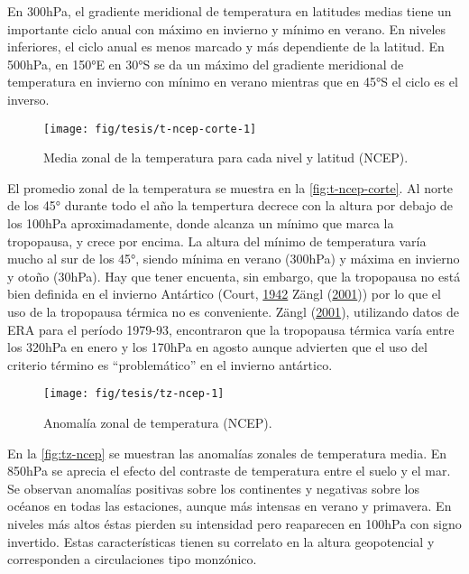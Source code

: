 \documentclass[spanish,a4paper,12pt]{book}
\begin{document}
En 300hPa, el gradiente meridional de temperatura en latitudes medias
tiene un importante ciclo anual con máximo en invierno y mínimo en
verano. En niveles inferiores, el ciclo anual es menos marcado y más
dependiente de la latitud. En 500hPa, en 150°E en 30°S se da un máximo
del gradiente meridional de temperatura en invierno con mínimo en verano
mientras que en 45°S el ciclo es el inverso.

\begin{figure*}
\texttt{[image: fig/tesis/t-ncep-corte-1]} \caption{Media zonal de la temperatura para cada nivel y latitud (NCEP).}\label{fig:t-ncep-corte}
\end{figure*}

El promedio zonal de la temperatura se muestra en la
\autoref{fig:t-ncep-corte}. Al norte de los 45° durante todo el año la
tempertura decrece con la altura por debajo de los 100hPa
aproximadamente, donde alcanza un mínimo que marca la tropopausa, y
crece por encima. La altura del mínimo de temperatura varía mucho al sur
de los 45°, siendo mínima en verano (300hPa) y máxima en invierno y
otoño (30hPa). Hay que tener encuenta, sin embargo, que la tropopausa no
está bien definida en el invierno Antártico (Court,
\protect\hyperlink{ref-Court1942}{1942} Zängl
(\protect\hyperlink{ref-Zangl2001}{2001})) por lo que el uso de la
tropopausa térmica no es conveniente. Zängl
(\protect\hyperlink{ref-Zangl2001}{2001}), utilizando datos de ERA para
el período 1979-93, encontraron que la tropopausa térmica varía entre
los 320hPa en enero y los 170hPa en agosto aunque advierten que el uso
del criterio término es ``problemático'' en el invierno antártico.

\begin{landscape}\begin{figure}

{\centering \texttt{[image: fig/tesis/tz-ncep-1]} 

}

\caption{Anomalía zonal de temperatura (NCEP).}\label{fig:tz-ncep}
\end{figure}
\end{landscape}

En la \autoref{fig:tz-ncep} se muestran las anomalías zonales de
temperatura media. En 850hPa se aprecia el efecto del contraste de
temperatura entre el suelo y el mar. Se observan anomalías positivas
sobre los continentes y negativas sobre los océanos en todas las
estaciones, aunque más intensas en verano y primavera. En niveles más
altos éstas pierden su intensidad pero reaparecen en 100hPa con signo
invertido. Estas características tienen su correlato en la altura
geopotencial y corresponden a circulaciones tipo monzónico.
\end{document}
